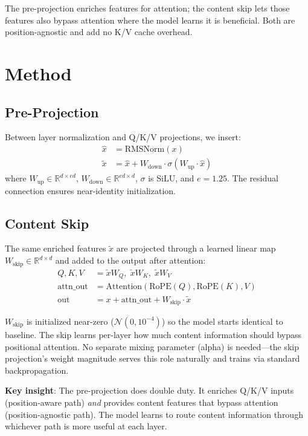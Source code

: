 \documentclass[11pt]{article}
\begin{document}
The pre-projection enriches features for attention; the content skip lets those features also bypass attention where the model learns it is beneficial. Both are position-agnostic and add no K/V cache overhead.

\section{Method}

\subsection{Pre-Projection}

Between layer normalization and Q/K/V projections, we insert:
\begin{align}
    \hat{x} &= \text{RMSNorm}(x) \\
    \tilde{x} &= \hat{x} + W_{\text{down}} \cdot \sigma(W_{\text{up}} \cdot \hat{x})
\end{align}
where $W_{\text{up}} \in \mathbb{R}^{d \times ed}$, $W_{\text{down}} \in \mathbb{R}^{ed \times d}$, $\sigma$ is SiLU, and $e = 1.25$. The residual connection ensures near-identity initialization.

\subsection{Content Skip}

The same enriched features $\tilde{x}$ are projected through a learned linear map $W_{\text{skip}} \in \mathbb{R}^{d \times d}$ and added to the output after attention:
\begin{align}
    Q, K, V &= \tilde{x}W_Q,\; \tilde{x}W_K,\; \tilde{x}W_V \\
    \text{attn\_out} &= \text{Attention}(\text{RoPE}(Q), \text{RoPE}(K), V) \\
    \text{out} &= x + \text{attn\_out} + W_{\text{skip}} \cdot \tilde{x}
\end{align}

$W_{\text{skip}}$ is initialized near-zero ($\mathcal{N}(0, 10^{-4})$) so the model starts identical to baseline. The skip learns per-layer how much content information should bypass positional attention. No separate mixing parameter (alpha) is needed---the skip projection's weight magnitude serves this role naturally and trains via standard backpropagation.

\textbf{Key insight}: The pre-projection does double duty. It enriches Q/K/V inputs (position-aware path) \textit{and} provides content features that bypass attention (position-agnostic path). The model learns to route content information through whichever path is more useful at each layer.
\end{document}
